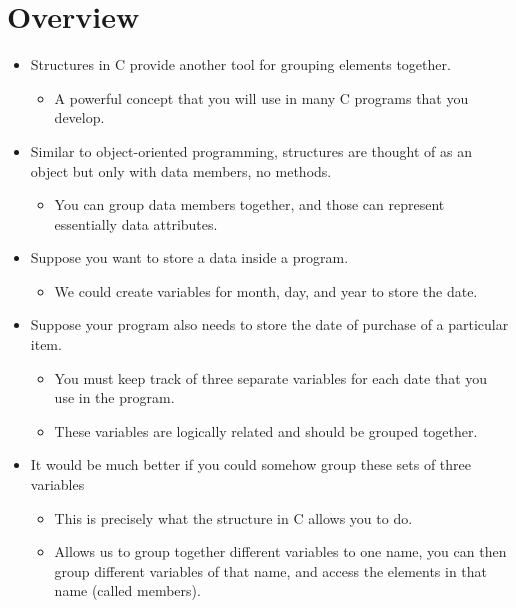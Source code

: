 \section{Overview}
\begin{itemize}
    \item Structures in C provide another tool for grouping elements together.
        \begin{itemize}
            \item A powerful concept that you will use in many C programs that you develop. 
        \end{itemize}
    
    \item Similar to object-oriented programming, structures are thought of as an object but only with data members, no methods. 
        \begin{itemize}
            \item You can group data members together, and those can represent essentially data attributes. 
        \end{itemize}
    
    \item Suppose you want to store a data inside a program.
        \begin{itemize}
            \item We could create variables for month, day, and year to store the date. 
        \end{itemize}
    
    \item Suppose your program also needs to store the date of purchase of a particular item.
        \begin{itemize}
            \item You must keep track of three separate variables for each date that you use in the program.
            \item These variables are logically related and should be grouped together. 
        \end{itemize}
    
    \item It would be much better if you could somehow group these sets of three variables
        \begin{itemize}
            \item This is precisely what the structure in C allows you to do. 
            \item Allows us to group together different variables to one name, you can then group different variables of that name, and access the elements in that name (called members).
        \end{itemize}
\end{itemize}

